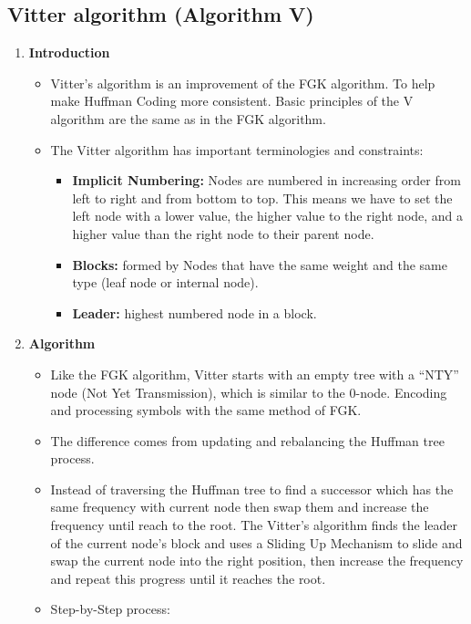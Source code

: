 \subsection{Vitter algorithm (Algorithm V)}
\begin{enumerate}[label=\textbf{\Alph*.}]
    \item \textbf{Introduction}
    \begin{itemize}
        \item Vitter’s algorithm is an improvement of the FGK algorithm. To help make Huffman Coding more consistent. Basic principles of the V algorithm are the same as in the FGK algorithm.
        \item The Vitter algorithm has important terminologies and constraints:
        \begin{itemize}
            \item \textbf{Implicit Numbering:} Nodes are numbered in increasing order from left to right and from bottom to top. This means we have to set the left node with a lower value, the higher value to the right node, and a higher value than the right node to their parent node.
            \item \textbf{Blocks:} formed by Nodes that have the same weight and the same type (leaf node or internal node).
            \item \textbf{Leader:} highest numbered node in a block.
        \end{itemize}
    \end{itemize}
    \item \textbf{Algorithm}
    \begin{itemize}
        \item Like the FGK algorithm, Vitter starts with an empty tree with a “NTY” node (Not Yet Transmission), which is similar to the 0-node. Encoding and processing symbols with the same method of FGK.
        \item The difference comes from updating and rebalancing the Huffman tree process.
        \item Instead of traversing the Huffman tree to find a successor which has the same frequency with current node then swap them and increase the frequency until reach to the root. The Vitter's algorithm finds the leader of the current node’s block and uses a Sliding Up Mechanism to slide and swap the current node into the right position, then increase the frequency and repeat this progress until it reaches the root.
        \item Step-by-Step process:

\end{itemize}
\end{enumerate}
